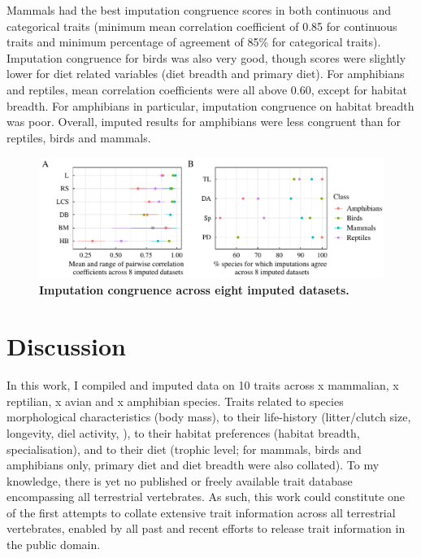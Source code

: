 Mammals had the best imputation congruence scores in both continuous and categorical traits (minimum mean correlation coefficient of 0.85 for continuous traits and minimum percentage of agreement of 85\% for categorical traits). Imputation congruence for birds was also very good, though scores were slightly lower for diet related variables (diet breadth and primary diet). For amphibians and reptiles, mean correlation coefficients were all above 0.60, except for habitat breadth. For amphibians in particular, imputation congruence on habitat breadth was poor. Overall, imputed results for amphibians were less congruent than for reptiles, birds and mammals.

\begin{figure}[h!]
\centering
\includegraphics[scale=0.75]{figures/chapter2/Congruence_imputations/Summary}
\caption[Imputation congruence across eight imputed datasets]{\textbf{Imputation congruence across eight imputed datasets.}}
\label{congruence}
\end{figure}


\pagebreak
\section{Discussion}


In this work, I compiled and imputed data on 10 traits across x mammalian, x reptilian, x avian and x amphibian species. Traits related to species morphological characteristics (body mass), to their life-history (litter/clutch size, longevity, diel activity, ), to their habitat preferences (habitat breadth, specialisation), and to their diet (trophic level; for mammals, birds and amphibians only, primary diet and diet breadth were also collated). To my knowledge, there is yet no published or freely available trait database encompassing all terrestrial vertebrates. As such, this work could constitute one of the first attempts to collate extensive trait information across all terrestrial vertebrates, enabled by all past and recent efforts to release trait information in the public domain.

